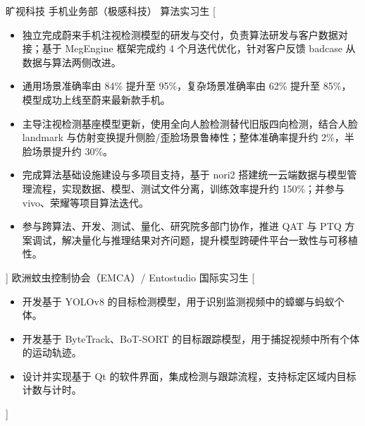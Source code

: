 \documentclass[zh]{resume}
\begin{document}
\begin{experiences}
    {旷视科技 \quad 手机业务部（极感科技） \quad 算法实习生}%
    [\begin{itemize}
      \item 独立完成蔚来手机注视检测模型的研发与交付，负责算法研发与客户数据对接；基于 MegEngine 框架完成约 4 个月迭代优化，针对客户反馈 badcase 从数据与算法两侧改进。
      \item 通用场景准确率由 84\% 提升至 95\%，复杂场景准确率由 62\% 提升至 85\%，模型成功上线至蔚来最新款手机。
      \item 主导注视检测基座模型更新，使用全向人脸检测替代旧版四向检测，结合人脸 landmark 与仿射变换提升侧脸/歪脸场景鲁棒性；整体准确率提升约 2\%，半脸场景提升约 30\%。
      \item 完成算法基础设施建设与多项目支持，基于 nori2 搭建统一云端数据与模型管理流程，实现数据、模型、测试文件分离，训练效率提升约 150\%；并参与 vivo、荣耀等项目算法迭代。
      \item 参与跨算法、开发、测试、量化、研究院多部门协作，推进 QAT 与 PTQ 方案调试，解决量化与推理结果对齐问题，提升模型跨硬件平台一致性与可移植性。
    \end{itemize}]
  \separator{0.5ex}
    {欧洲蚊虫控制协会（EMCA）/ Entostudio \quad 国际实习生}%
    [\begin{itemize}
      \item 开发基于 YOLOv8 的目标检测模型，用于识别监测视频中的蟑螂与蚂蚁个体。
      \item 开发基于 ByteTrack、BoT-SORT 的目标跟踪模型，用于捕捉视频中所有个体的运动轨迹。
      \item 设计并实现基于 Qt 的软件界面，集成检测与跟踪流程，支持标定区域内目标计数与计时。
    \end{itemize}]
\end{experiences}
\end{document}
